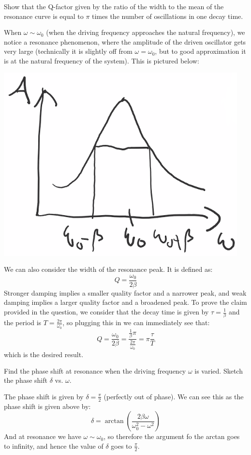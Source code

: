 \documentclass[../PHYS306Notes.tex]{subfiles}
\begin{document}
\begin{p}
Show that the Q-factor given by the ratio of the width to the mean of the resonance curve is equal to $\pi$ times the number of oscillations in one decay time.
\end{p}
\begin{s}
When $\omega \sim \omega_0$ (when the driving frequency approaches the natural frequency), we notice a resonance phenomenon, where the amplitude of the driven oscillator gets very large (technically it is slightly off from $\omega = \omega_0$, but to good approximation it is at the natural frequency of the system). This is pictured below:
\begin{center}
    \includegraphics[scale=0.5]{Lecture-9/w9-img2.png}
\end{center}
We can also consider the width of the resonance peak. It is defined as:
\[Q = \frac{\omega_0}{2\beta}\]
Stronger damping implies a smaller quality factor and a narrower peak, and weak damping implies a larger quality factor and a broadened peak. To prove the claim provided in the question, we consider that the decay time is given by $\tau = \frac{1}{\beta}$ and the period is $T = \frac{2\pi}{\omega_0}$, so plugging this in we can immediately see that:
\[Q = \frac{\omega_0}{2\beta} = \frac{\frac{1}{\beta}\pi}{\frac{2\pi}{\omega_0}} = \pi\frac{\tau}{T}\]
which is the desired result.
\end{s}

\begin{p}
Find the phase shift at resonance when the driving frequency $\omega$ is varied. Sketch the phase shift $\delta$ vs. $\omega$.
\end{p}
\begin{s}
The phase shift is given by $\delta = \frac{\pi}{2}$ (perfectly out of phase). We can see this as the phase shift is given above by:
\[\delta = \arctan(\frac{2\beta\omega}{\omega_0^2 - \omega^2})\]
And at resonance we have $\omega \sim \omega_0$, so therefore the argument fo the arctan goes to infinity, and hence the value of $\delta$ goes to $\frac{\pi}{2}$.
\end{s}
\end{document}
